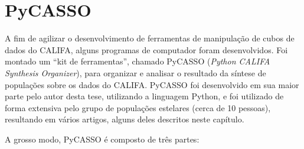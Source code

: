 


\chapter{PyCASSO}
\label{sec:pycasso}

A fim de agilizar o desenvolvimento de ferramentas de manipulação de cubos de
dados do CALIFA, alguns programas de computador foram desenvolvidos. Foi montado
um ``kit de ferramentas'', chamado PyCASSO ({\em Python CALIFA} \starlight\ {\em
Synthesis Organizer}), para organizar e analisar o resultado da síntese de
populações sobre os dados do CALIFA. PyCASSO foi desenvolvido em sua maior parte
pelo autor desta tese, utilizando a linguagem Python, e foi utilizado de forma
extensiva pelo grupo de populações estelares (cerca de 10 pessoas), resultando
em vários artigos, alguns deles descritos neste capítulo.

A grosso modo, PyCASSO é composto de três partes:

